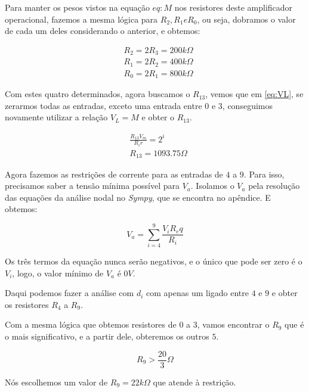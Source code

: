Para manter os pesos vistos na equação $eq:M$ nos resistores deste amplificador operacional, fazemos a mesma lógica para $R_2, R_1 e R_0$, ou seja, dobramos o valor de cada um deles considerando o anterior, e obtemos:

\begin{equation}
    \begin{aligned}
         & R_2 = 2 R_3 = 200k \varOmega \\
         & R_1 = 2 R_2 = 400k \varOmega \\
         & R_0 = 2 R_1 = 800k \varOmega
    \end{aligned}
\end{equation}

Com estes quatro determinados, agora buscamos o $R_{13}$, vemos que em \ref{eq:VL}, se zerarmos todas as entradas, exceto uma entrada entre $0$ e $3$, conseguimos novamente utilizar a relação $V_L = M$ e obter o $R_{13}$.

\begin{equation}
    \begin{aligned}
         & \frac{R_{13} V_m }{R_i r} = 2^i \\
         & R_{13} = 1093.75 \varOmega
    \end{aligned}
\end{equation}

Agora fazemos as restrições de corrente para as entradas de $4$ a $9$. Para isso, precisamos saber a tensão mínima possível para $V_a$. Isolamos o $V_a$ pela resolução das equações da análise nodal no \emph{Sympy}, que se encontra no apêndice. E obtemos:

\begin{equation}
    V_a = \sum_{i=4}^{9} \frac{V_i R_eq}{R_i}
\end{equation}

Os três termos da equação nunca serão negativos, e o único que pode ser zero é o $V_i$, logo, o valor mínimo de $V_a$ é $0V$.

Daqui podemos fazer a análise com $d_i$ com apenas um ligado entre $4$ e $9$ e obter os resistores $R_4$ a $R_9$.

Com a mesma lógica que obtemos resistores de $0$ a $3$, vamos encontrar o $R_9$ que é o mais significativo, e a partir dele, obteremos os outros $5$.

\begin{equation}
    R_9 > \frac{20}{3} \varOmega
\end{equation}

Nós escolhemos um valor de $R_9 = 22k \Omega$ que atende à restrição.

